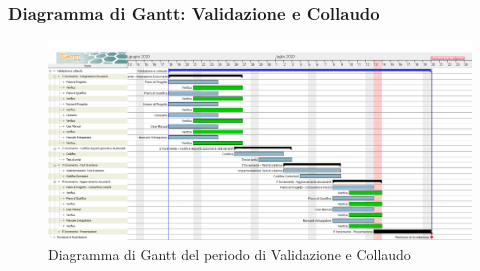 	\subsubsection{Diagramma di Gantt: Validazione e Collaudo}
		\begin{figure}[h]
			\centering
			\includegraphics[width=1.1\textwidth]{./res/img/DiagrammiGantt/validaz_gantt.png}
			\caption{Diagramma di Gantt del periodo di Validazione e Collaudo}
		\end{figure}
